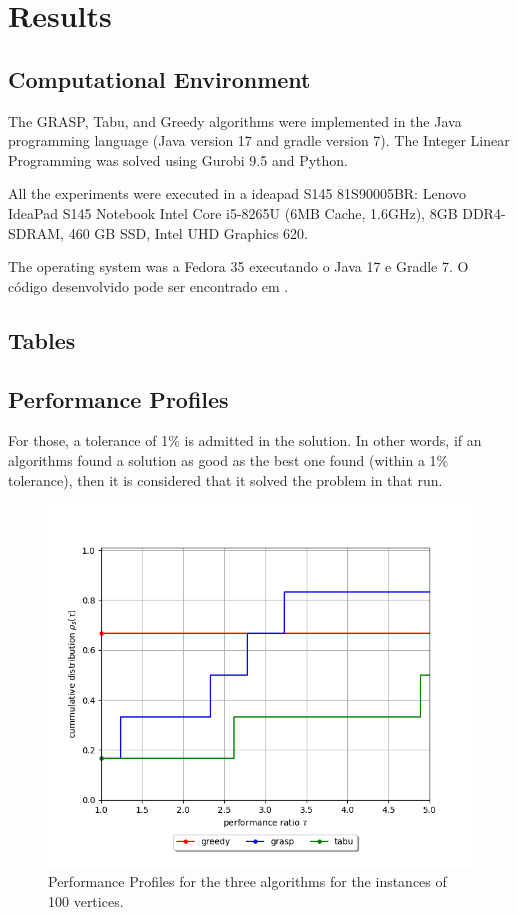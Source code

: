 \section{Results}

\subsection{Computational Environment}

The GRASP, Tabu, and Greedy algorithms were implemented in the Java programming language (Java version 17 and gradle version 7). The Integer Linear Programming was solved using Gurobi 9.5 and Python.

All the experiments were executed in a ideapad S145 81S90005BR: Lenovo IdeaPad S145 Notebook Intel Core i5-8265U (6MB Cache, 1.6GHz), 8GB DDR4-SDRAM, 460 GB SSD, Intel UHD Graphics 620.

The operating system was a Fedora 35 executando o Java 17 e Gradle 7. O código desenvolvido pode ser encontrado em \cite{bib:github}.

\subsection{Tables}





\subsection{Performance Profiles}

For those, a tolerance of 1\% is admitted in the solution. In other words, if an algorithms found a solution as good as the best one found (within a 1\% tolerance), then it is considered that it solved the problem in that run.

\begin{figure}[H]
    \centering
    \includegraphics[width=\textwidth]{images/performance_profile/100_thmax_5.0.png}
    \caption{Performance Profiles for the three algorithms for the instances of 100 vertices.}
    \label{fig:perf-100}
\end{figure}

